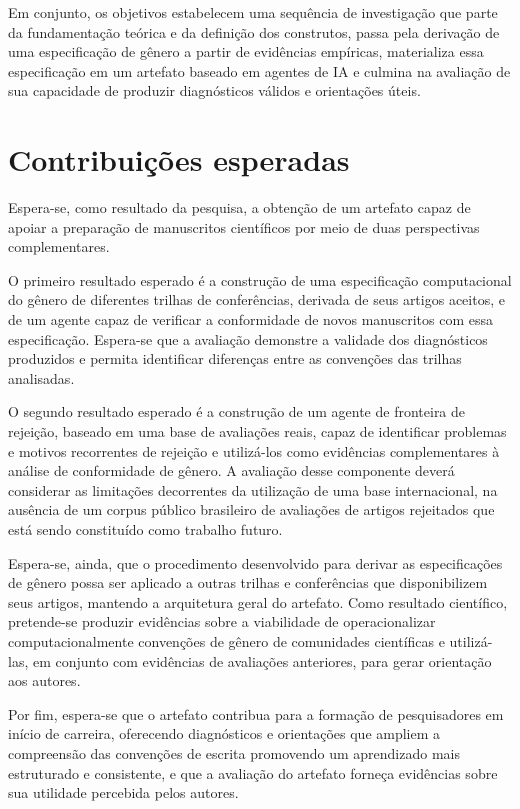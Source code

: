 Em conjunto, os objetivos estabelecem uma sequência de investigação que parte da fundamentação teórica e da definição dos construtos, passa pela derivação de uma especificação de gênero a partir de evidências empíricas, materializa essa especificação em um artefato baseado em agentes de IA e culmina na avaliação de sua capacidade de produzir diagnósticos válidos e orientações úteis. 


\section{Contribuições esperadas}

Espera-se, como resultado da pesquisa, a obtenção de um artefato capaz de apoiar a preparação de manuscritos científicos por meio de duas perspectivas complementares.

O primeiro resultado esperado é a construção de uma especificação computacional do gênero de diferentes trilhas de conferências, derivada de seus artigos aceitos, e de um agente capaz de verificar a conformidade de novos manuscritos com essa especificação. Espera-se que a avaliação demonstre a validade dos diagnósticos produzidos e permita identificar diferenças entre as convenções das trilhas analisadas.

O segundo resultado esperado é a construção de um agente de fronteira de rejeição, baseado em uma base de avaliações reais, capaz de identificar problemas e motivos recorrentes de rejeição e utilizá-los como evidências complementares à análise de conformidade de gênero. A avaliação desse componente deverá considerar as limitações decorrentes da utilização de uma base internacional, na ausência de um corpus público brasileiro de avaliações de artigos rejeitados que está sendo constituído como trabalho futuro. 

Espera-se, ainda, que o procedimento desenvolvido para derivar as especificações de gênero possa ser aplicado a outras trilhas e conferências que disponibilizem seus artigos, mantendo a arquitetura geral do artefato. Como resultado científico, pretende-se produzir evidências sobre a viabilidade de operacionalizar computacionalmente convenções de gênero de comunidades científicas e utilizá-las, em conjunto com evidências de avaliações anteriores, para gerar orientação aos autores.

Por fim, espera-se que o artefato contribua para a formação de pesquisadores em início de carreira, oferecendo diagnósticos e orientações que ampliem a compreensão das convenções de escrita promovendo um aprendizado mais estruturado e consistente, e que a avaliação do artefato forneça evidências sobre sua utilidade percebida pelos autores.
